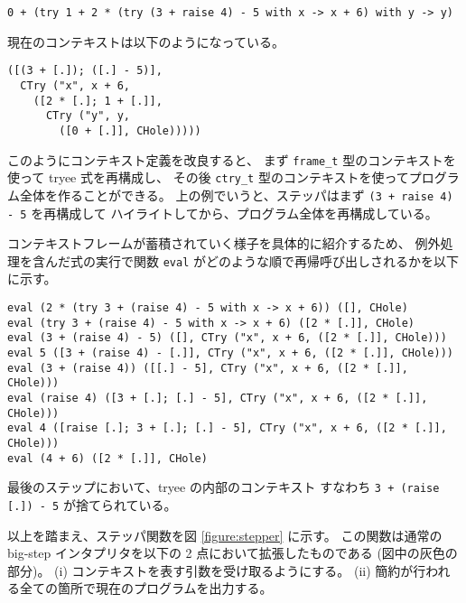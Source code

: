 \begin{verbatim}
0 + (try 1 + 2 * (try (3 + raise 4) - 5 with x -> x + 6) with y -> y)
\end{verbatim}
\noindent 現在のコンテキストは以下のようになっている。
\begin{verbatim}
([(3 + [.]); ([.] - 5)],
  CTry ("x", x + 6,
    ([2 * [.]; 1 + [.]],
      CTry ("y", y,
        ([0 + [.]], CHole)))))
\end{verbatim}

このようにコンテキスト定義を改良すると、
まず \texttt{frame\_t} 型のコンテキストを使って tryee 式を再構成し、
その後 \texttt{ctry\_t} 型のコンテキストを使ってプログラム全体を作ることができる。
上の例でいうと、ステッパはまず \texttt{(3 + raise 4) - 5} を再構成して
ハイライトしてから、プログラム全体を再構成している。

コンテキストフレームが蓄積されていく様子を具体的に紹介するため、
例外処理を含んだ式の実行で関数 \texttt{eval} がどのような順で再帰呼び出しされるかを以下に示す。

\begin{verbatim}
eval (2 * (try 3 + (raise 4) - 5 with x -> x + 6)) ([], CHole)
eval (try 3 + (raise 4) - 5 with x -> x + 6) ([2 * [.]], CHole)
eval (3 + (raise 4) - 5) ([], CTry ("x", x + 6, ([2 * [.]], CHole)))
eval 5 ([3 + (raise 4) - [.]], CTry ("x", x + 6, ([2 * [.]], CHole)))
eval (3 + (raise 4)) ([[.] - 5], CTry ("x", x + 6, ([2 * [.]], CHole)))
eval (raise 4) ([3 + [.]; [.] - 5], CTry ("x", x + 6, ([2 * [.]], CHole)))
eval 4 ([raise [.]; 3 + [.]; [.] - 5], CTry ("x", x + 6, ([2 * [.]], CHole)))
eval (4 + 6) ([2 * [.]], CHole)
\end{verbatim}

\noindent 最後のステップにおいて、tryee の内部のコンテキスト
すなわち \texttt{3 + (raise [.])\ - 5} が捨てられている。

以上を踏まえ、ステッパ関数を図 \ref{figure:stepper} に示す。
この関数は通常の big-step インタプリタを以下の 2 点において拡張したものである (図中の灰色の部分)。
(i) コンテキストを表す引数を受け取るようにする。
(ii) 簡約が行われる全ての箇所で現在のプログラムを出力する。

